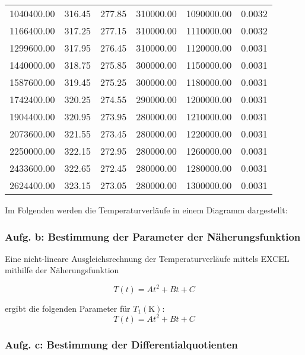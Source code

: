 \begin{table}
\begin{tabular}{c c c c c c}
    1040400.00 &  316.45 &  277.85 & 310000.00 & 1090000.00 &      0.0032 \\
    1166400.00 &  317.25 &  277.15 & 310000.00 & 1110000.00 &      0.0032 \\
    1299600.00 &  317.95 &  276.45 & 310000.00 & 1120000.00 &      0.0031 \\
    1440000.00 &  318.75 &  275.85 & 300000.00 & 1150000.00 &      0.0031 \\
    1587600.00 &  319.45 &  275.25 & 300000.00 & 1180000.00 &      0.0031 \\
    1742400.00 &  320.25 &  274.55 & 290000.00 & 1200000.00 &      0.0031 \\
    1904400.00 &  320.95 &  273.95 & 280000.00 & 1210000.00 &      0.0031 \\
    2073600.00 &  321.55 &  273.45 & 280000.00 & 1220000.00 &      0.0031 \\
    2250000.00 &  322.15 &  272.95 & 280000.00 & 1260000.00 &      0.0031 \\
    2433600.00 &  322.65 &  272.45 & 280000.00 & 1280000.00 &      0.0031 \\
    2624400.00 &  323.15 &  273.05 & 280000.00 & 1300000.00 &      0.0031 \\
    \bottomrule
  \end{tabular}
\end{table}

\newpage

Im Folgenden werden die Temperaturverläufe in einem Diagramm dargestellt:

\subsubsection{Aufg. b: Bestimmung der Parameter der Näherungsfunktion}

Eine nicht-lineare Ausgleichsrechnung der Temperaturverläufe mittels EXCEL mithilfe der Näherungsfunktion

\begin{equation} 
  T(t) = At^2 + Bt + C 
\end{equation}

ergibt die folgenden Parameter für $T_{1} (\unit{\kelvin})$:
\begin{equation} 
  T(t) = At^2 + Bt + C 
\end{equation}


\subsubsection{Aufg. c: Bestimmung der Differentialquotienten}


